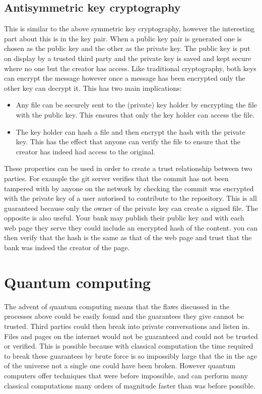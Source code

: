 \documentclass[12pt]{article}
\begin{document}
\subsection{Antisymmetric key cryptography}
This is similar to the above symmetric key cryptography, however the
interesting part about this is in the key pair. When a public key pair is generated one is chosen as the public key and the other as the private key. The public key is put on display by a trusted third party and the private key is saved and kept secure where no one but the creator has access. Like traditional cryptography, both keys can encrypt the message however once a message has been encrypted only the other key can decrypt it. This has two main implications:
\begin{itemize}
	\item Any file can be securely sent to the (private) key holder by
     encrypting the file with the public key. This ensures that
     only the key holder can access the file.
	\item The key holder can hash a file and then encrypt the hash with the
     private key. This has the effect that anyone can verify the file
     to ensure that the creator has indeed had access to the original.
\end{itemize}
These properties can be used in order to create a trust relationship between two parties. For example the git server verifies that the commit has not been tampered with by anyone on the network by checking the commit was encrypted with the private key of a user autorised to contribute to the repository. This is all guaranteed because only the owner of the private key can create a signed file.
The opposite is also useful. Your bank may publish their public key and with each web page they serve they could include an encrypted hash of the content. you can then verify that the hash is the same as that of the web page and trust that the bank was indeed the creator of the page.

\section{Quantum computing}
The advent of quantum computing means that the flaws discussed in the
processes above could be easily found and the guarantees they give cannot
be trusted. Third parties could then break into private conversations and listen in. 
Files and pages on the internet would not be guaranteed and could not be trusted or verified. This is possible because with classical computation the time required to break these guarantees by brute force is so impossibly large that the in the age of the universe not a single one
could have been broken. However quantum computers offer techniques that
were before impossible, and can perform many classical computations many orders of magnitude faster 
than was before possible.
\end{document}
